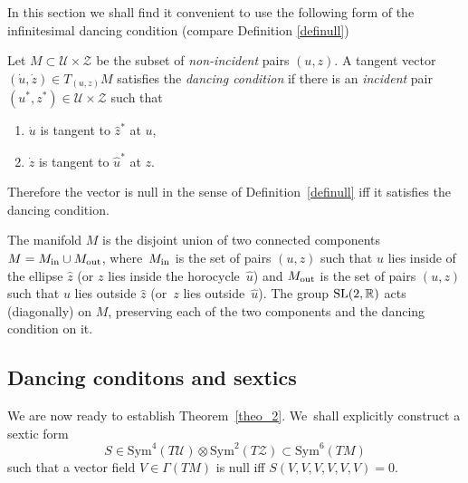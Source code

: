 \documentclass[pdftex]{sigma}%
\numberwithin{equation}{section}
\newcommand{\Z}{\mathbb{Z}}
\newcommand{\R}{\mathbb{R}}
\renewcommand{\Z}{\mathcal{Z}}
\newcommand{\U}{\mathcal{U}}
\newcommand{\uh}{\widehat{u}}
\newcommand{\zh}{\widehat{z}}
\begin{document}
In this section we shall find it convenient to use the following form
of the infinitesimal dancing condition (compare Definition \ref{definull})
\begin{Definition}Let $M\subset \U\times\Z$ be the subset of {\em non-incident} pairs $(u,z)$. A tangent vector $(\dot u, \dot z)\in T_{(u,z)}M$ satisfies the {\em dancing condition} if there is an {\em incident} pair $(u^*, z^*)\in\U\times\Z$ such that
\begin{enumerate}\itemsep=0pt
\item[$(1)$] $\dot u$ is tangent to $\zh^*$ at $u$,
\item[$(2)$] $\dot z$ is tangent to $\uh^*$ at $z$.
\end{enumerate}
\end{Definition}

Therefore the vector is null in the sense of Definition~\ref{definull} iff it satisfies the dancing condition.

The manifold $M$ is the disjoint union of two connected components $M=M_{\rm in}\cup M_{\rm out}$, where~$M_{\rm in}$ is the set of pairs $(u,z)$ such that $u$ lies inside of the ellipse $\zh$ (or $z$ lies inside the horocycle~$\uh$) and $M_{\rm out}$ is the set of pairs $(u,z)$ such that $u$ lies outside $\zh$ (or~$z$ lies outside~$\uh$). The group ${\rm SL}(2, \R)$ acts (diagonally) on $M$, preserving each of the two components and the dancing condition on it.

\subsection{Dancing conditons and sextics}
We are now ready to establish Theorem~\ref{theo_2}. We~shall explicitly construct a sextic form
\[
S\in \mbox{Sym}^4(T\U)\otimes \mbox{Sym}^2(T\Z)\subset \mbox{Sym}^6(TM)
\]
such that a vector field $V\in \Gamma(TM)$ is null iff $S(V, V, V, V, V, V)=0$.
\end{document}

